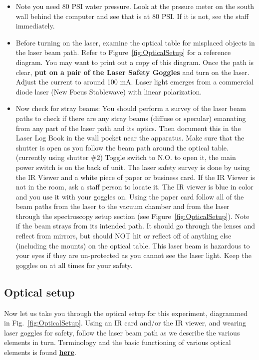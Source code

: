 \documentclass{../lab}
\begin{document}
\begin{itemize}
    \item Note you need 80 PSI water pressure. Look at the prssure meter on the south wall behind the computer and see that is at 80 PSI.  If it is not, see the staff immediately.

    \item Before turning on the laser, examine the optical table for misplaced objects in the laser beam path. Refer to Figure~\ref{fig:OpticalSetup} for a reference diagram. You may want to print out a copy of this diagram. Once the path is clear, \textbf{put on a pair of the Laser Safety Goggles} and turn on the laser. Adjust the current to around 100 mA. Laser light emerges from a commercial diode laser (New Focus Stablewave) with linear polarization.

    \item Now check for stray beams: You should perform a survey of the laser beam paths to check if there are any stray beams (diffuse or specular) emanating from any part of the laser path and its optics. Then document this in the Laser Log Book in the wall pocket near the apparatus. Make sure that the shutter is open as you follow the beam path around the optical table. (currently using shutter \#2) Toggle switch to N.O. to open it, the main power switch is on the back of unit. The laser safety survey is done by using the IR Viewer and a white piece of paper or business card. If the IR Viewer is not in the room, ask a staff person to locate it. The IR viewer is blue in color and you use it with your goggles on. Using the paper card follow all of the beam paths from the laser to the vacuum chamber and from the laser through the spectroscopy setup section (see Figure~\ref{fig:OpticalSetup}). Note if the beam strays from its intended path. It should go through the lenses and reflect from mirrors, but should NOT hit or reflect off of anything else (including the mounts) on the optical table. This laser beam is hazardous to your eyes if they are un-protected as you cannot see the laser light. Keep the goggles on at all times for your safety.
    
\end{itemize}

\subsection{Optical setup}

Now let us take you through the optical setup for this experiment, diagrammed in Fig.\ \ref{fig:OpticalSetup}.  Using an IR card and/or the IR viewer, and wearing laser goggles for safety, follow the laser beam path as we describe the various elements in turn.  Terminology and the basic functioning of various optical elements is found \href{http://experimentationlab.berkeley.edu/sites/default/files/Definitions\%20for\%20MOT.pdf}{\textbf{here}}.
\end{document}
